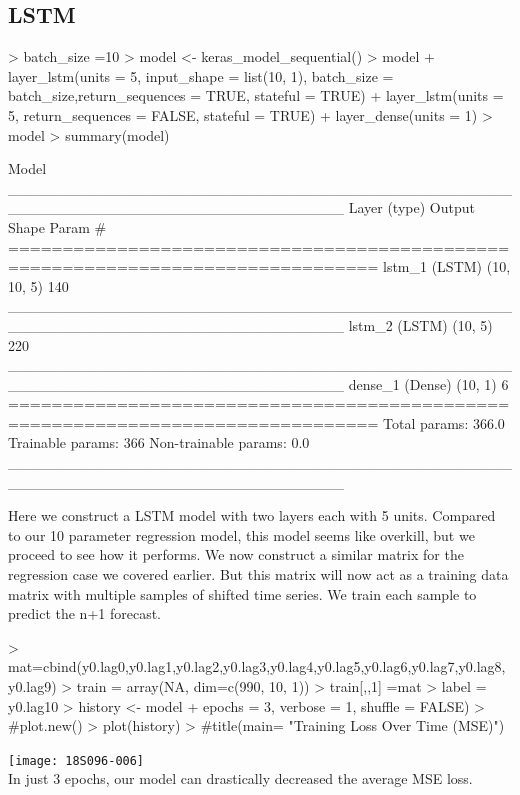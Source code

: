 \documentclass{article}
\begin{document}
\subsection{LSTM}
\begin{Schunk}
\begin{Sinput}
> batch_size =10
> model <- keras_model_sequential()
> model %
+   layer_lstm(units = 5, input_shape = list(10, 1), batch_size = batch_size,return_sequences = TRUE, stateful = TRUE) %
+   layer_lstm(units = 5, return_sequences = FALSE, stateful = TRUE) %
+   layer_dense(units = 1)
> model %
> summary(model)
\end{Sinput}
\begin{Soutput}
Model
________________________________________________________________________________
Layer (type)                        Output Shape                    Param #     
================================================================================
lstm_1 (LSTM)                       (10, 10, 5)                     140         
________________________________________________________________________________
lstm_2 (LSTM)                       (10, 5)                         220         
________________________________________________________________________________
dense_1 (Dense)                     (10, 1)                         6           
================================================================================
Total params: 366.0
Trainable params: 366
Non-trainable params: 0.0
________________________________________________________________________________
\end{Soutput}
\end{Schunk}
Here we construct a LSTM model with two layers each with 5 units. Compared to our 10 parameter regression model, this model seems like overkill, but we proceed to see how it performs.
We now construct a similar matrix for the regression case we covered earlier. But this matrix will now act as a training data matrix with multiple samples of shifted time series. We train each sample to predict the n+1 forecast.
\begin{Schunk}
\begin{Sinput}
> mat=cbind(y0.lag0,y0.lag1,y0.lag2,y0.lag3,y0.lag4,y0.lag5,y0.lag6,y0.lag7,y0.lag8,y0.lag9)
> train = array(NA, dim=c(990, 10, 1))
> train[,,1] =mat
> label = y0.lag10
> history <- model %
+                 epochs = 3, verbose = 1, shuffle = FALSE)
> #plot.new()
> plot(history)
> #title(main= "Training Loss Over Time (MSE)")
\end{Sinput}
\end{Schunk}
\texttt{[image: 18S096-006]}
\\In just 3 epochs, our model can drastically decreased the average MSE loss.
\end{document}

